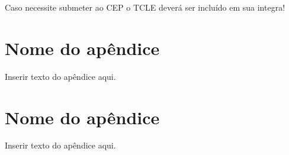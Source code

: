 %
%

Caso necessite submeter ao CEP o TCLE deverá ser incluído em sua integra!


\begin{apendicesenv}
\partapendices

\chapter{Nome do apêndice}
\label{chap:apendicex}

Inserir texto do apêndice aqui.

\chapter{Nome do apêndice}
\label{chap:apendicey}

Inserir texto do apêndice aqui.

\end{apendicesenv}
